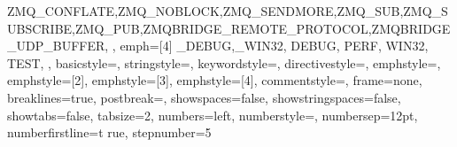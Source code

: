 {{		ZMQ_CONFLATE,ZMQ_NOBLOCK,ZMQ_SENDMORE,ZMQ_SUB,ZMQ_SUBSCRIBE,ZMQ_PUB,ZMQBRIDGE_REMOTE_PROTOCOL,ZMQBRIDGE_UDP_BUFFER,
	},
	emph={[4]
		_DEBUG,_WIN32,
		DEBUG,
		PERF,
		WIN32,
		TEST,
	},
	basicstyle=\FONTsizetwo\FONTmonospaceseries,
	stringstyle=,
	keywordstyle=,
	directivestyle={},
	emphstyle=,
	emphstyle={[2]},
	emphstyle={[3]},
	emphstyle={[4]},
	commentstyle=,
	frame=none,
	breaklines=true,
	postbreak=,
	showspaces=false,
	showstringspaces=false,
	showtabs=false,
	tabsize=2,
	numbers=left,
	numberstyle=\FONTsizeone{},
	numbersep=12pt,
	numberfirstline=t rue,
	stepnumber=5
}


\SIUNITXnewunit{}
\SIUNITXnewunit{}


\renewcommand\tabularxcolumn[1]{m{#1}}



\TITLESECformat{\part}{\FLOATcenter\FONTnormalseries\FONTsizenine\FONTboldseries}{\FONTuppercaseseries{\TITLESECpartname~\TITLESECpartnum}}{0pt}{\\\FLOATverticalspace{2pc}}


\renewcommand{\cftdot}{}


\renewcommand{\UrlFont}{\FONTmonospace\FONTsizetwo}



